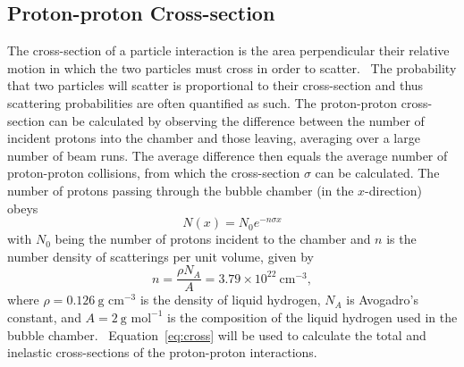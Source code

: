 \documentclass[twocolumn]{article}
\begin{document}
\subsection{Proton-proton Cross-section}
The cross-section of a particle interaction is the area perpendicular their relative motion in which the two particles must cross in order to scatter.~\cite{Thompson} The probability that two particles will scatter is proportional to their cross-section and thus scattering probabilities are often quantified as such. The proton-proton cross-section can be calculated by observing the difference between the number of incident protons into the chamber and those leaving, averaging over a large number of beam runs. The average difference then equals the average number of proton-proton collisions, from which the cross-section $\sigma$ can be calculated. The number of protons passing through the bubble chamber (in the $x$-direction) obeys~\cite{seul}
\begin{equation} \label{eq:cross}
N(x) = N_0 e^{-n \sigma x}
\end{equation}
with $N_0$ being the number of protons incident to the chamber and $n$ is the number density of scatterings per unit volume, given by
\begin{equation*}
n = \frac {\rho N_A} {A} = 3.79 \times 10^{22} ~\text{cm}^{-3},
\end{equation*}
where $\rho=0.126 ~\text{g cm}^{-3}$ is the density of liquid hydrogen, $N_A$ is Avogadro's constant, and $A=2 ~\text{g mol}^{-1}$ is the composition of the liquid hydrogen used in the bubble chamber.~\cite{harigel} Equation~\ref{eq:cross} will be used to calculate the total and inelastic cross-sections of the proton-proton interactions.
\end{document}
